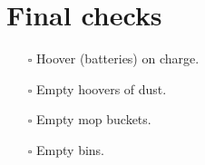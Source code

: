 \documentclass[a4paper, 12pt, final, oneside]{article}
\begin{document}
\section*{Final checks}
\begin{itemize}
    \item[\(\square\)] Hoover (batteries) on charge.
    \item[\(\square\)] Empty hoovers of dust.
    \item[\(\square\)] Empty mop buckets.
    \item[\(\square\)] Empty bins.
\end{itemize}
\end{document}
